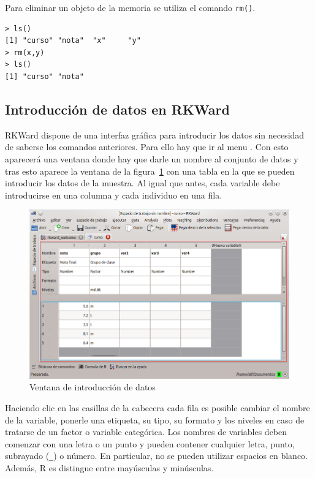 Para eliminar un objeto de la memoria se utiliza el comando \lstinline{rm()}.
\begin{lstlisting}
> ls()
[1] "curso" "nota"  "x"     "y"    
> rm(x,y)
> ls()
[1] "curso" "nota"
\end{lstlisting}


\subsection{Introducción de datos en RKWard}
RKWard dispone de una interfaz gráfica para introducir los datos sin necesidad de saberse los comandos anteriores.
Para ello hay que ir al menu . Con esto
aparecerá una ventana donde hay que darle un nombre al conjunto de datos y tras esto aparece la ventana de la
figura~\ref{g:matriz_datos} con una tabla en la que se pueden introducir los datos de la muestra.
Al igual que antes, cada variable debe introducirse en una columna y cada individuo en una fila.

\begin{figure}[htp]
\begin{center}
  \includegraphics[scale=0.6]{capitulos/introduccion/img/matriz_datos}
  \caption{Ventana de introducción de datos}
  \label{g:matriz_datos}
\end{center}
\end{figure}

Haciendo clic en las casillas de la cabecera cada fila es posible cambiar el nombre de la variable, ponerle una
etiqueta, su tipo, su formato y los niveles en caso de tratarse de un factor o variable categórica.
Los nombres de variables deben comenzar con una letra o un punto y pueden contener cualquier letra, punto, subrayado
(\lstinline{_}) o número.
En particular, no se pueden utilizar espacios en blanco.
Además, R es distingue entre mayúsculas y minúsculas.

